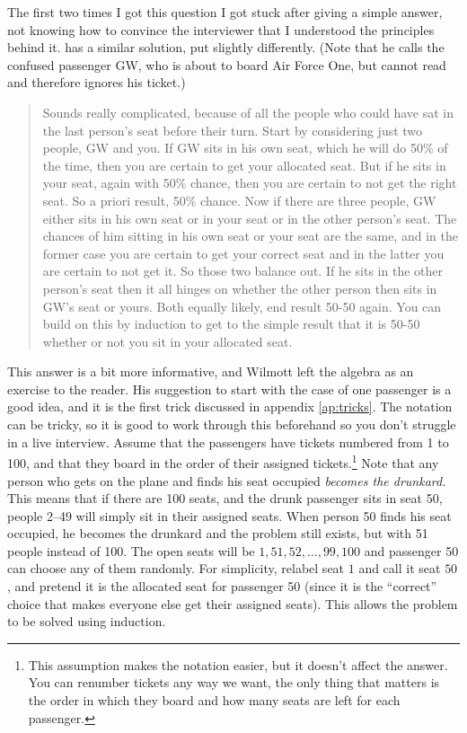 \documentclass[a4paper]{article}
\begin{document}
The first two times I got this question I got stuck after giving a simple answer, not knowing how to convince the interviewer that I understood the principles behind it.
\citet{WilmottFAQ} has a similar solution, put slightly differently. (Note that he calls the confused passenger GW, who is about to board Air Force One, but cannot read and therefore ignores his ticket.)
\begin{quote}
Sounds really complicated, because of all the people
who could have sat in the last person’s seat before
their turn. Start by considering just two people, GW and
you. If GW sits in his own seat, which he will do 50\%
of the time, then you are certain to get your allocated
seat. But if he sits in your seat, again with 50\% chance,
then you are certain to not get the right seat. So a priori
result, 50\% chance. Now if there are three people, GW
either sits in his own seat or in your seat or in the
other person’s seat. The chances of him sitting in his
own seat or your seat are the same, and in the former
case you are certain to get your correct seat and in
the latter you are certain to not get it. So those two
balance out. If he sits in the other person’s seat then
it all hinges on whether the other person then sits in
GW’s seat or yours. Both equally likely, end result 50-50
again. You can build on this by induction to get to the
simple result that it is 50-50 whether or not you sit in
your allocated seat.
\end{quote}
This answer is a bit more informative, and Wilmott left the algebra as an exercise to the reader.
His suggestion to start with the case of one passenger is a good idea, and it is the first trick discussed in appendix \ref{ap:tricks}.
The notation can be tricky, so it is good to work through this beforehand so you don't struggle in a live interview.
Assume that the passengers have tickets numbered from 1 to 100, and that they board in the order of their assigned tickets.\footnote{This assumption makes the notation easier, but it doesn't affect the answer. You can renumber tickets any way we want, the only thing that matters is the order in which they board and how many seats are left for each passenger.}
Note that any person who gets on the plane and finds his seat occupied \emph{becomes the drunkard.}
This means that if there are 100 seats, and the drunk passenger sits in seat 50, people 2--49 will simply sit in their assigned seats.
When person 50 finds his seat occupied, he becomes the drunkard and the problem still exists, but with 51 people instead of 100. The open seats will be
$1, 51,52,\ldots,99,100$
and passenger 50 can choose any of them randomly. For simplicity,  relabel seat $1$ and call it seat $50$, and pretend it is the allocated seat for passenger 50 (since it is the ``correct'' choice that makes everyone else get their assigned seats).
This allows the problem to be solved using induction.
\end{document}

